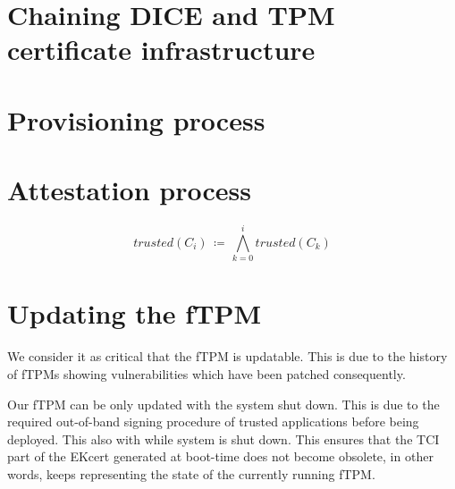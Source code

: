 \section{Chaining DICE and TPM certificate infrastructure}

\section{Provisioning process}


\section{Attestation process}


\begin{equation}
trusted(C_{i}) \, \coloneqq \, \bigwedge_{k=0}^{i} trusted(C_{k})
\end{equation}

\section{Updating the fTPM}

We consider it as critical that the \ac{fTPM} is updatable. This is due to the history of \acp{fTPM} showing vulnerabilities which have been patched consequently. %

Our \ac{fTPM} can be only updated with the system shut down. This is due to the required out-of-band signing procedure of trusted applications before being deployed. This also  with while system is shut down. This ensures that the TCI part of the EKcert generated at boot-time does not become obsolete, in other words, keeps representing the state of the currently running fTPM.


